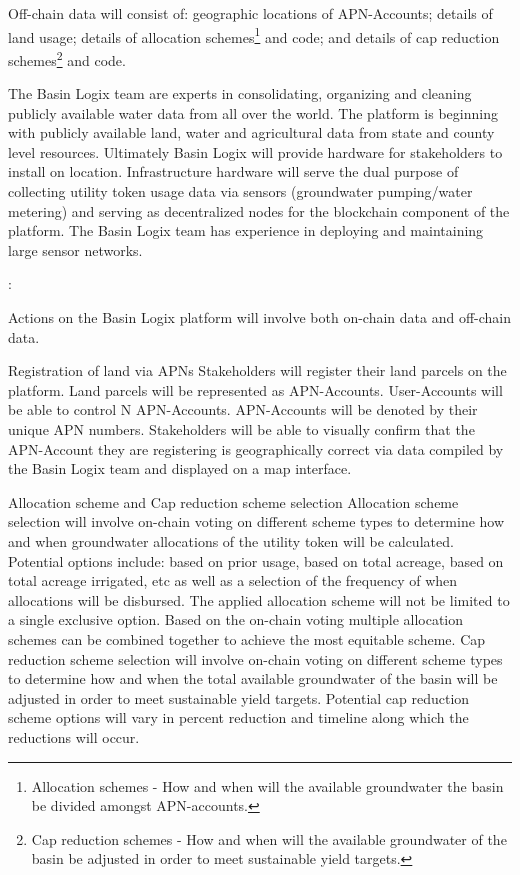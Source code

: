 \documentclass{tufte-handout}
\begin{document}
Off-chain data will consist of: geographic locations of APN-Accounts; details of land usage; details of allocation schemes\footnote{Allocation schemes - How and when will the available groundwater the basin be divided amongst APN-accounts.} and code; and details of cap reduction schemes\footnote{Cap reduction schemes - How and when will the available groundwater of the basin be adjusted in order to meet sustainable yield targets.} and code.

The Basin Logix team are experts in consolidating, organizing and cleaning publicly available water data from all over the world. The platform is beginning with publicly available land, water and agricultural data from state and county level resources. Ultimately Basin Logix will provide hardware for stakeholders to install on location. Infrastructure hardware will serve the dual purpose of collecting utility token usage data via sensors (groundwater pumping/water metering) and serving as decentralized nodes for the blockchain component of the platform. The Basin Logix team has experience in deploying and maintaining large sensor networks.

:

	Actions on the Basin Logix platform will involve both on-chain data and off-chain data. \break 

Registration of land via APNs \break
Stakeholders will register their land parcels on the platform. Land parcels will be represented as APN-Accounts. User-Accounts will be able to control N APN-Accounts. APN-Accounts will be denoted by their unique APN numbers. Stakeholders will be able to visually confirm that the APN-Account they are registering is geographically correct via data compiled by the Basin Logix team and displayed on a map interface. 

Allocation scheme and Cap reduction scheme selection \break
Allocation scheme selection will involve on-chain voting on different scheme types to determine how and when groundwater allocations of the utility token will be calculated. Potential options include: based on prior usage, based on total acreage, based on total acreage irrigated, etc as well as a selection of the frequency of when allocations will be disbursed. The applied allocation scheme will not be limited to a single exclusive option. Based on the on-chain voting multiple allocation schemes can be combined together to achieve the most equitable scheme. Cap reduction scheme selection will involve on-chain voting on different scheme types to determine how and when the total available groundwater of the basin will be adjusted in order to meet sustainable yield targets. Potential cap reduction scheme options will vary in percent reduction and timeline along which the reductions will occur. 
\end{document}
